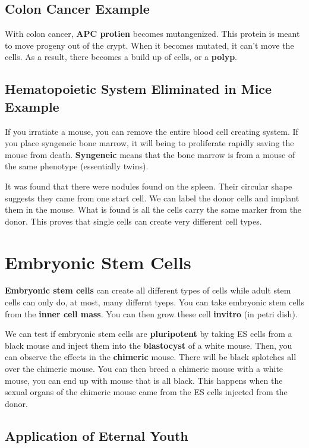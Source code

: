 \documentclass{article}
\begin{document}
\subsection{ Colon Cancer Example }

With colon cancer, \textbf{APC protien} becomes mutangenized. This protein is
meant to move progeny out of the crypt. When it becomes mutated, it can't move
the cells. As a result, there becomes a build up of cells, or a \textbf{polyp}.

\subsection{ Hematopoietic System Eliminated in Mice Example }

If you irratiate a mouse, you can remove the entire blood cell creating system.
If you place syngeneic bone marrow, it will being to proliferate rapidly saving
the mouse from death. \textbf{Syngeneic} means that the bone marrow is from a
mouse of the same phenotype (essentially twins).

It was found that there were nodules found on the spleen. Their circular shape
suggests they came from one start cell. We can label the donor cells and implant
them in the mouse. What is found is all the cells carry the same marker from the
donor. This proves that single cells can create very different cell types.

\section{ Embryonic Stem Cells }

\textbf{Embryonic stem cells} can create all different types of cells while
adult stem cells can only do, at most, many differnt tyeps. You can take
embryonic stem cells from the \textbf{inner cell mass}. You can then grow these
cell \textbf{invitro} (in petri dish).

We can test if embryonic stem cells are \textbf{pluripotent} by taking ES cells
from a black mouse and inject them into the \textbf{blastocyst} of a white
mouse. Then, you can observe the effects in the \textbf{chimeric} mouse. There
will be black splotches all over the chimeric mouse. You can then breed a
chimeric mouse with a white mouse, you can end up with mouse that is all black.
This happens when the sexual organs of the chimeric mouse came from the ES cells
injected from the donor.

\subsection{ Application of Eternal Youth }
\end{document}
